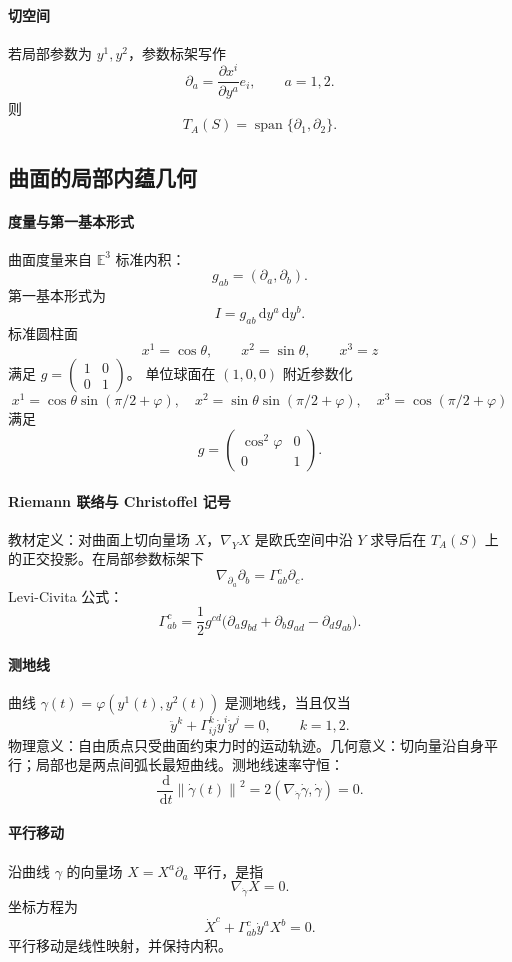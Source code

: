 \documentclass[UTF8,12pt,a4paper]{ctexart}
\newcommand{\E}{\mathbb E}
\newcommand{\dd}{\,\mathrm d}
\newcommand{\norm}[1]{\left\lVert #1\right\rVert}
\newcommand{\inner}[2]{\left(#1,#2\right)}
\newcommand{\spn}{\operatorname{span}}
\begin{document}
\paragraph{切空间}
若局部参数为 $y^1,y^2$，参数标架写作
\[
\partial_a=\frac{\partial x^i}{\partial y^a}e_i,\qquad a=1,2.
\]
则
\[
T_A(S)=\spn\{\partial_1,\partial_2\}.
\]

\subsection{曲面的局部内蕴几何}
\paragraph{度量与第一基本形式}
曲面度量来自 $\E^3$ 标准内积：
\[
g_{ab}=\inner{\partial_a}{\partial_b}.
\]
第一基本形式为
\[
I=g_{ab}\dd y^a\dd y^b.
\]
标准圆柱面
\[
x^1=\cos\theta,\qquad x^2=\sin\theta,\qquad x^3=z
\]
满足 $g=\begin{pmatrix}1&0\\0&1\end{pmatrix}$。
单位球面在 $(1,0,0)$ 附近参数化
\[
x^1=\cos\theta\sin(\pi/2+\varphi),\quad
x^2=\sin\theta\sin(\pi/2+\varphi),\quad
x^3=\cos(\pi/2+\varphi)
\]
满足
\[
g=\begin{pmatrix}\cos^2\varphi&0\\0&1\end{pmatrix}.
\]

\paragraph{Riemann 联络与 Christoffel 记号}
教材定义：对曲面上切向量场 $X$，$\nabla_YX$ 是欧氏空间中沿 $Y$ 求导后在 $T_A(S)$ 上的正交投影。在局部参数标架下
\[
\nabla_{\partial_a}\partial_b=\Gamma^c_{ab}\partial_c.
\]
Levi-Civita 公式：
\[
\Gamma^c_{ab}
=\frac12g^{cd}
\bigl(\partial_ag_{bd}+\partial_bg_{ad}-\partial_dg_{ab}\bigr).
\]

\paragraph{测地线}
曲线 $\gamma(t)=\varphi(y^1(t),y^2(t))$ 是测地线，当且仅当
\[
\ddot y^k+\Gamma^k_{ij}\dot y^i\dot y^j=0,\qquad k=1,2.
\]
物理意义：自由质点只受曲面约束力时的运动轨迹。几何意义：切向量沿自身平行；局部也是两点间弧长最短曲线。测地线速率守恒：
\[
\frac{\dd}{\dd t}\norm{\dot\gamma(t)}^2
=2\inner{\nabla_{\dot\gamma}\dot\gamma}{\dot\gamma}=0.
\]

\paragraph{平行移动}
沿曲线 $\gamma$ 的向量场 $X=X^a\partial_a$ 平行，是指
\[
\nabla_{\dot\gamma}X=0.
\]
坐标方程为
\[
\dot X^c+\Gamma^c_{ab}\dot y^aX^b=0.
\]
平行移动是线性映射，并保持内积。
\end{document}
